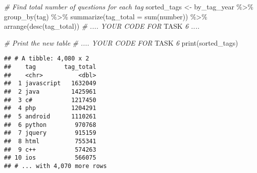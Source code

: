 \documentclass[
]{article}
\newenvironment{Shaded}{\begin{snugshade}}{\end{snugshade}}
\newcommand{\AlertTok}[1]{\textcolor[rgb]{0.94,0.16,0.16}{#1}}
\newcommand{\AttributeTok}[1]{\textcolor[rgb]{0.77,0.63,0.00}{#1}}
\newcommand{\CommentTok}[1]{\textcolor[rgb]{0.56,0.35,0.01}{\textit{#1}}}
\newcommand{\FunctionTok}[1]{\textcolor[rgb]{0.00,0.00,0.00}{#1}}
\newcommand{\NormalTok}[1]{#1}
\newcommand{\OtherTok}[1]{\textcolor[rgb]{0.56,0.35,0.01}{#1}}
\newcommand{\SpecialCharTok}[1]{\textcolor[rgb]{0.00,0.00,0.00}{#1}}
\begin{document}
\begin{Shaded}
\begin{Highlighting}[]
\CommentTok{\# Find total number of questions for each tag}
\NormalTok{sorted\_tags }\OtherTok{\textless{}{-}}\NormalTok{ by\_tag\_year }\SpecialCharTok{\%\textgreater{}\%}
  \FunctionTok{group\_by}\NormalTok{(tag) }\SpecialCharTok{\%\textgreater{}\%}
  \FunctionTok{summarize}\NormalTok{(}\AttributeTok{tag\_total =} \FunctionTok{sum}\NormalTok{(number)) }\SpecialCharTok{\%\textgreater{}\%}
  \FunctionTok{arrange}\NormalTok{(}\FunctionTok{desc}\NormalTok{(tag\_total))}
\CommentTok{\# .... YOUR CODE FOR }\AlertTok{TASK}\CommentTok{ 6 ....}

\CommentTok{\# Print the new table}
\CommentTok{\# .... YOUR CODE FOR }\AlertTok{TASK}\CommentTok{ 6}
\FunctionTok{print}\NormalTok{(sorted\_tags)}
\end{Highlighting}
\end{Shaded}

\begin{verbatim}
## # A tibble: 4,080 x 2
##    tag        tag_total
##    <chr>          <dbl>
##  1 javascript   1632049
##  2 java         1425961
##  3 c#           1217450
##  4 php          1204291
##  5 android      1110261
##  6 python        970768
##  7 jquery        915159
##  8 html          755341
##  9 c++           574263
## 10 ios           566075
## # ... with 4,070 more rows
\end{verbatim}

\begin{Shaded}
\end{Shaded}
\end{document}
